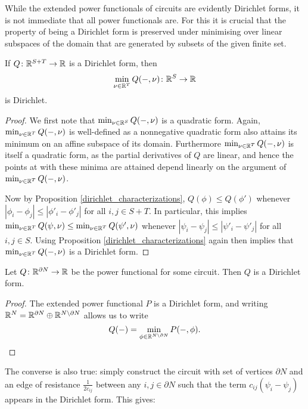 While the extended power functionals of circuits are evidently Dirichlet forms,
it is not immediate that all power functionals are. For this it is crucial that
the property of being a Dirichlet form is preserved under minimising over linear
subspaces of the domain that are generated by subsets of the given finite set.

\begin{proposition} \label{dirichlet_minimization}
  If $Q{\colon} {\mathbb{R}}^{S+T} \to {\mathbb{R}}$ is a Dirichlet form, then 
  \[
    \min_{\nu \in {\mathbb{R}}^T} Q(-,\nu){\colon} {\mathbb{R}}^S \to {\mathbb{R}} 
  \]
  is Dirichlet.
\end{proposition}
\begin{proof}
  We first note that $\min_{\nu \in {\mathbb{R}}^S} Q(-,\nu)$ is a quadratic form. Again,
  $\min_{\nu \in {\mathbb{R}}^T} Q(-,\nu)$ is well-defined as a nonnegative quadratic form
  also attains its minimum on an affine subspace of its domain. Furthermore
  $\min_{\nu \in {\mathbb{R}}^T} Q(-,\nu)$ is itself a quadratic form, as the partial
  derivatives of $Q$ are linear, and hence the points at with these minima are
  attained depend linearly on the argument of $\min_{\nu \in {\mathbb{R}}^T} Q(-,\nu)$.

  Now by Proposition \ref{dirichlet_characterizations}, $Q(\phi) \le Q(\phi')$
  whenever $|\phi_i - \phi_j| \le |\phi'_i - \phi'_j|$ for all $i,j \in S+T$. In
  particular, this implies $\min_{\nu \in {\mathbb{R}}^T} Q(\psi,\nu) \le \min_{\nu \in
  {\mathbb{R}}^T} Q(\psi',\nu)$ whenever $|\psi_i - \psi_j| \le |\psi'_i - \psi'_j|$ for
  all $i,j \in S$. Using Proposition \ref{dirichlet_characterizations} again
  then implies that $\min_{\nu \in {\mathbb{R}}^T} Q(-,\nu)$ is a Dirichlet form.
\end{proof}


\begin{corollary}
  Let $Q {\colon} {\mathbb{R}}^{\partial N} \to {\mathbb{R}}$ be the power functional for some circuit. Then
  $Q$ is a Dirichlet form.
\end{corollary}
\begin{proof}
  The extended power functional $P$ is a Dirichlet form, and writing ${\mathbb{R}}^N=
  {\mathbb{R}}^{\partial N} \oplus {\mathbb{R}}^{N \setminus \partial N}$ allows us to write
  \[
    Q(-) =  \min_{\phi\in {\mathbb{R}}^{N \setminus \partial N}}
    P(-,\phi). \qedhere
  \]
\end{proof}

The converse is also true: simply construct the circuit with set of vertices
$\partial N$ and an edge of resistance $\frac{1}{2c_{ij}}$ between any $i,j \in
\partial N$ such that the term $c_{ij}(\psi_i - \psi_j)$ appears in the
Dirichlet form. This gives: 

